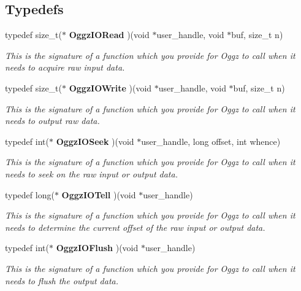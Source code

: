 \subsection*{Typedefs}
\begin{CompactItemize}
\item 
typedef size\_\-t($\ast$ {\bf Oggz\-IORead} )(void $\ast$user\_\-handle, void $\ast$buf, size\_\-t n)
\begin{CompactList}\small\item\em This is the signature of a function which you provide for Oggz to call when it needs to acquire raw input data. \item\end{CompactList}\item 
typedef size\_\-t($\ast$ {\bf Oggz\-IOWrite} )(void $\ast$user\_\-handle, void $\ast$buf, size\_\-t n)
\begin{CompactList}\small\item\em This is the signature of a function which you provide for Oggz to call when it needs to output raw data. \item\end{CompactList}\item 
typedef int($\ast$ {\bf Oggz\-IOSeek} )(void $\ast$user\_\-handle, long offset, int whence)
\begin{CompactList}\small\item\em This is the signature of a function which you provide for Oggz to call when it needs to seek on the raw input or output data. \item\end{CompactList}\item 
typedef long($\ast$ {\bf Oggz\-IOTell} )(void $\ast$user\_\-handle)
\begin{CompactList}\small\item\em This is the signature of a function which you provide for Oggz to call when it needs to determine the current offset of the raw input or output data. \item\end{CompactList}\item 
typedef int($\ast$ {\bf Oggz\-IOFlush} )(void $\ast$user\_\-handle)
\begin{CompactList}\small\item\em This is the signature of a function which you provide for Oggz to call when it needs to flush the output data. \item\end{CompactList}\end{CompactItemize}
